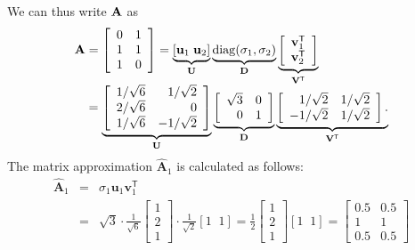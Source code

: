 We can thus write $\bf A$ as 
\[
\begin{array}{l}
\mathbf{A} = \left[\begin{array}{rr}0&1\\1&1\\1&0\end{array}\right] =
\underbrace{\left[\mathbf{u}_1\;\mathbf{u}_2\right]}_{\mathbf{U}}
\underbrace{\mathrm{diag}(\sigma_1,\sigma_2)}_{\mathbf{D}}
\underbrace{\left[\begin{array}{c}\mathbf{v}_1^\mathsf{T}\\\mathbf{v}_2^\mathsf{T}\end{array}\right]}_{\mathbf{V}^\mathsf{T}}\\
\hspace*{4mm}= 
\underbrace{\left[\begin{array}{rr}1/\sqrt{6}& 1/\sqrt{2}\\
                                                           2/\sqrt{6} & 0                          \\
                                                           1/\sqrt{6} & -1/\sqrt{2}\end{array}\right]}_{\mathbf{U}}
\underbrace{\left[\begin{array}{rr}\sqrt{3}& 0 \\
                                                            0 & 1 \end{array}\right]}_{\mathbf{D}}
\underbrace{\left[\begin{array}{rr}1/\sqrt{2} & 1/\sqrt{2}\\ -1/\sqrt{2} & 1/\sqrt{2}\end{array}\right].}_{\mathbf{V}^\mathsf{T}}
\end{array}
\]
The matrix approximation $\widehat {\mathbf A}_1$ is calculated as follows:
\[
\begin{array}{lll}
\widehat{\mathbf{A}}_1 & = & \sigma_1\mathbf{u}_1 \mathbf{v}_1^\mathsf{T}  \\
& = & 
\sqrt{3} \cdot \frac{1}{\sqrt{6}}\left[ \begin{array}{r} 1 \\ 2\\ 1 \end{array} \right]\cdot\frac{1}{\sqrt{2}}
\left[1\;\;1\right] = \frac{1}{2}
\left[\begin{array}{r} 1\\ 2\\ 1\end{array}\right] \left[1\;\;1\right] = \left[\begin{array}{ll}0.5 & 0.5\\ 1 & 1 \\ 0.5 & 0.5\end{array}\right]\\\\
\end{array}
\]
